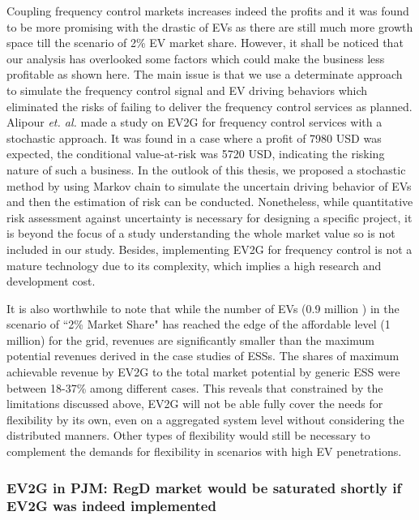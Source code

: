 Coupling frequency control markets increases indeed the profits and it was found to be more promising with the drastic of EVs as there are still much more growth space till the scenario of 2\% EV market share. However, it shall be noticed that our analysis has overlooked some factors which could make the business less profitable as shown here. The main issue is that we use a determinate approach to simulate the frequency control signal and EV driving behaviors which eliminated the risks of failing to deliver the frequency control services as planned. Alipour \textit{et. al.}\cite{Alipour2017} made a study on EV2G for frequency control services with a stochastic approach. It was found in a case where a profit of 7980 USD was expected, the conditional value-at-risk was 5720 USD, indicating the risking nature of such a business. In the outlook of this thesis, we proposed a stochastic method by using Markov chain to simulate the uncertain driving behavior of EVs and then the estimation of risk can be conducted. Nonetheless, while quantitative risk assessment against uncertainty is necessary for designing a specific project, it is beyond the focus of a study understanding the whole market value so is not included in our study. Besides, implementing EV2G for frequency control is not a mature technology due to its complexity\cite{Peng2017}\cite{Shafie-Khah2015}\cite{Bessa2014}\cite{Bessa2013}, which implies a high research and development cost.

It is also worthwhile to note that while the number of EVs (0.9 million ) in the scenario of ``2\% Market Share" has reached the edge of the affordable level (1 million) for the grid, revenues are significantly smaller than the maximum potential revenues derived in the case studies of ESSs. The shares of maximum achievable revenue by EV2G to the total market potential by generic ESS were between 18-37\% among different cases. This reveals that constrained by the limitations discussed above, EV2G will not be able fully cover the needs for flexibility by its own, even on a aggregated system level without considering the distributed manners. Other types of flexibility would still be necessary to complement the demands for flexibility in scenarios with high EV penetrations.

\subsubsection{EV2G in PJM: RegD market would be saturated shortly if EV2G was indeed implemented}

